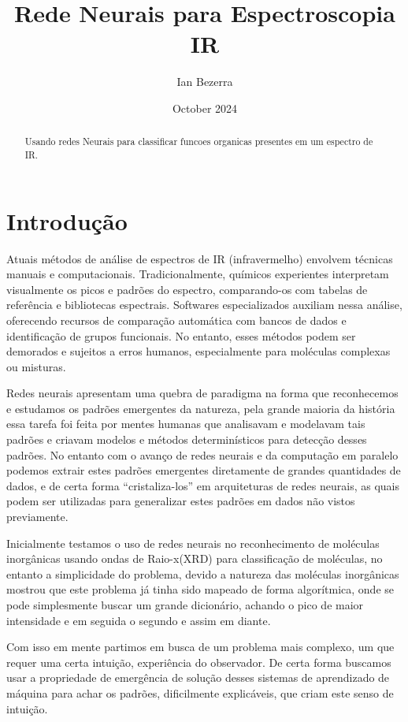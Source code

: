 \documentclass[11pt,a4paper]{article}
\title{Rede Neurais para Espectroscopia IR}
\author{Ian Bezerra}
\date{October 2024}
\begin{document}
\maketitle


\begin{abstract}
    Usando redes Neurais para classificar funcoes organicas presentes em um espectro de IR.
\end{abstract}

\section{Introdução}
Atuais métodos de análise de espectros de IR (infravermelho) envolvem técnicas manuais e computacionais. Tradicionalmente, químicos experientes interpretam visualmente os picos e padrões do espectro, comparando-os com tabelas de referência e bibliotecas espectrais. Softwares especializados auxiliam nessa análise, oferecendo recursos de comparação automática com bancos de dados e identificação de grupos funcionais. No entanto, esses métodos podem ser demorados e sujeitos a erros humanos, especialmente para moléculas complexas ou misturas. 

Redes neurais apresentam uma quebra de paradigma na forma que reconhecemos e estudamos os padrões emergentes da natureza, pela grande maioria da história essa tarefa foi feita por mentes humanas que analisavam e modelavam tais padrões e criavam modelos e métodos determinísticos para detecção desses padrões. No entanto com o avanço de redes neurais e da computação em paralelo podemos extrair estes padrões emergentes diretamente de grandes quantidades de dados, e de certa forma “cristaliza-los” em arquiteturas de redes neurais, as quais podem ser utilizadas para generalizar estes padrões em dados não vistos previamente.

Inicialmente testamos o uso de redes neurais no reconhecimento de moléculas inorgânicas usando ondas de Raio-x(XRD) para classificação de moléculas, no entanto a simplicidade do problema, devido a natureza das moléculas inorgânicas mostrou que este problema já tinha sido mapeado de forma algorítmica, onde se pode simplesmente buscar um grande dicionário, achando o pico de maior intensidade e em seguida o segundo e assim em diante.

Com isso em mente partimos em busca de um problema mais complexo, um que requer uma certa intuição, experiência do observador. De certa forma buscamos usar a propriedade de emergência de solução desses sistemas de aprendizado de máquina para achar os padrões, dificilmente explicáveis, que criam este senso de intuição.
\end{document}
